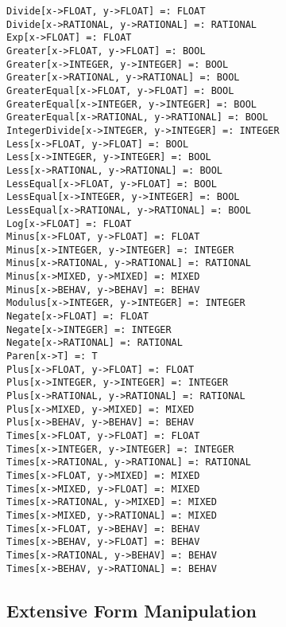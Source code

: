 \begin{verbatim}
Divide[x->FLOAT, y->FLOAT] =: FLOAT
Divide[x->RATIONAL, y->RATIONAL] =: RATIONAL
Exp[x->FLOAT] =: FLOAT
Greater[x->FLOAT, y->FLOAT] =: BOOL
Greater[x->INTEGER, y->INTEGER] =: BOOL
Greater[x->RATIONAL, y->RATIONAL] =: BOOL
GreaterEqual[x->FLOAT, y->FLOAT] =: BOOL
GreaterEqual[x->INTEGER, y->INTEGER] =: BOOL
GreaterEqual[x->RATIONAL, y->RATIONAL] =: BOOL
IntegerDivide[x->INTEGER, y->INTEGER] =: INTEGER
Less[x->FLOAT, y->FLOAT] =: BOOL
Less[x->INTEGER, y->INTEGER] =: BOOL
Less[x->RATIONAL, y->RATIONAL] =: BOOL
LessEqual[x->FLOAT, y->FLOAT] =: BOOL
LessEqual[x->INTEGER, y->INTEGER] =: BOOL
LessEqual[x->RATIONAL, y->RATIONAL] =: BOOL
Log[x->FLOAT] =: FLOAT
Minus[x->FLOAT, y->FLOAT] =: FLOAT
Minus[x->INTEGER, y->INTEGER] =: INTEGER
Minus[x->RATIONAL, y->RATIONAL] =: RATIONAL
Minus[x->MIXED, y->MIXED] =: MIXED
Minus[x->BEHAV, y->BEHAV] =: BEHAV
Modulus[x->INTEGER, y->INTEGER] =: INTEGER
Negate[x->FLOAT] =: FLOAT
Negate[x->INTEGER] =: INTEGER
Negate[x->RATIONAL] =: RATIONAL
Paren[x->T] =: T
Plus[x->FLOAT, y->FLOAT] =: FLOAT
Plus[x->INTEGER, y->INTEGER] =: INTEGER
Plus[x->RATIONAL, y->RATIONAL] =: RATIONAL
Plus[x->MIXED, y->MIXED] =: MIXED
Plus[x->BEHAV, y->BEHAV] =: BEHAV
Times[x->FLOAT, y->FLOAT] =: FLOAT
Times[x->INTEGER, y->INTEGER] =: INTEGER
Times[x->RATIONAL, y->RATIONAL] =: RATIONAL
Times[x->FLOAT, y->MIXED] =: MIXED
Times[x->MIXED, y->FLOAT] =: MIXED
Times[x->RATIONAL, y->MIXED] =: MIXED
Times[x->MIXED, y->RATIONAL] =: MIXED
Times[x->FLOAT, y->BEHAV] =: BEHAV
Times[x->BEHAV, y->FLOAT] =: BEHAV
Times[x->RATIONAL, y->BEHAV] =: BEHAV
Times[x->BEHAV, y->RATIONAL] =: BEHAV
\end{verbatim}

\subsection{Extensive Form Manipulation}

